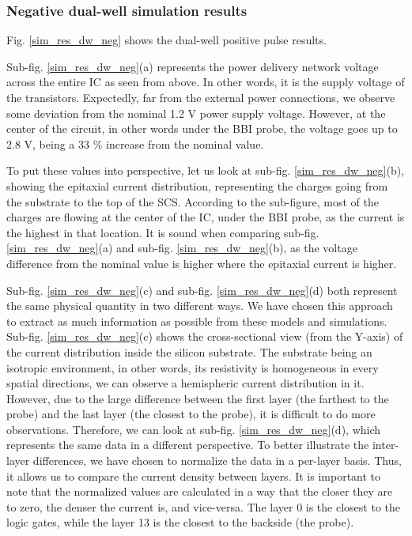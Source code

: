 	\subsubsection{Negative dual-well simulation results}
		Fig. \ref{sim_res_dw_neg} shows the dual-well positive pulse results.

		Sub-fig. \ref{sim_res_dw_neg}(a) represents the power delivery network voltage across the entire IC as seen from above.
		In other words, it is the supply voltage of the transistors.
		Expectedly, far from the external power connections, we observe some deviation from the nominal 1.2 V power supply voltage.
		However, at the center of the circuit, in other words under the BBI probe, the voltage goes up to 2.8 V, being a 33 \% increase from the nominal value.

		To put these values into perspective, let us look at sub-fig. \ref{sim_res_dw_neg}(b), showing the epitaxial current distribution, representing the charges going from the substrate to the top of the SCS.
		According to the sub-figure, most of the charges are flowing at the center of the IC, under the BBI probe, as the current is the highest in that location.
		It is sound when comparing sub-fig. \ref{sim_res_dw_neg}(a) and sub-fig. \ref{sim_res_dw_neg}(b), as the voltage difference from the nominal value is higher where the epitaxial current is higher.

		Sub-fig. \ref{sim_res_dw_neg}(c) and sub-fig. \ref{sim_res_dw_neg}(d) both represent the same physical quantity in two different ways.
		We have chosen this approach to extract as much information as possible from these models and simulations.
		Sub-fig. \ref{sim_res_dw_neg}(c) shows the cross-sectional view (from the Y-axis) of the current distribution inside the silicon substrate.
		The substrate being an isotropic environment, in other words, its resistivity is homogeneous in every spatial directions, we can observe a hemispheric current distribution in it.
		However, due to the large difference between the first layer (the farthest to the probe) and the last layer (the closest to the probe), it is difficult to do more observations.
		Therefore, we can look at sub-fig. \ref{sim_res_dw_neg}(d), which represents the same data in a different perspective.
		To better illustrate the inter-layer differences, we have chosen to normalize the data in a per-layer basis.
		Thus, it allows us to compare the current density between layers.
		It is important to note that the normalized values are calculated in a way that the closer they are to zero, the denser the current is, and vice-versa.
		The layer 0 is the closest to the logic gates, while the layer 13 is the closest to the backside (the probe).
